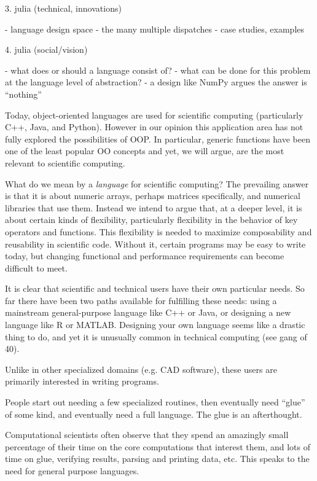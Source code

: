 3. julia (technical, innovations)

- language design space
- the many multiple dispatches
- case studies, examples


4. julia (social/vision)


- what does or should a language consist of?
- what can be done for this problem at the language level of abstraction?
  - a design like NumPy argues the answer is ``nothing''

Today, object-oriented languages are used for scientific computing
(particularly C++, Java, and Python). However in our opinion this
application area has not fully explored the possibilities of OOP. In
particular, generic functions have been one of the least popular
OO concepts and yet, we will argue, are the most relevant to scientific
computing.


What do we mean by a \emph{language} for scientific computing?
The prevailing
answer is that it is about numeric arrays, perhaps matrices specifically,
and numerical libraries that use them.
Instead we intend to argue that, at a
deeper level, it is about certain kinds of flexibility, particularly
flexibility in the behavior of key operators and functions. This flexibility
is needed to maximize composability and reusability in scientific code.
Without it, certain programs may be easy to write today, but changing
functional and performance requirements can become difficult to meet.





It is clear that scientific and technical users have their own particular
needs. So far there have been two paths available for fulfilling these
needs: using a mainstream general-purpose language like C++ or Java, or
designing a new language like R or MATLAB. Designing your own language
seems like a drastic thing to do, and yet it is unusually common in
technical computing (see gang of 40).

Unlike in other specialized domains (e.g. CAD software), these users
are primarily interested in writing programs.

People start out needing a few specialized routines, then eventually
need ``glue'' of some kind, and eventually need a full language.
The glue is an afterthought.

Computational scientists often observe that they spend an amazingly
small percentage of their time on the core computations that
interest them, and lots of time on glue, verifying results,
parsing and printing data, etc. This speaks to the need for
general purpose languages.

